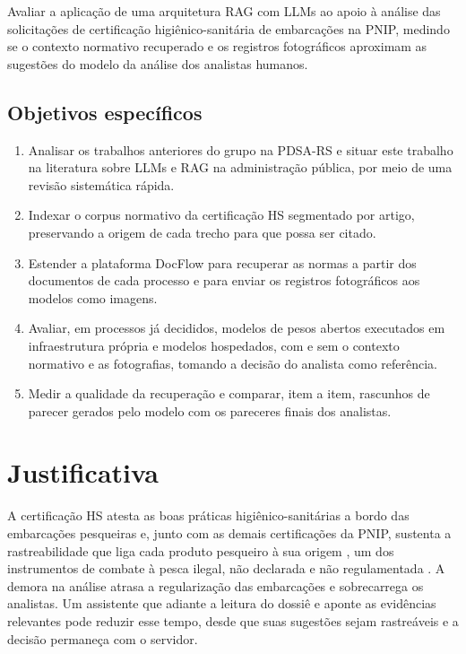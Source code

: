 Avaliar a aplicação de uma arquitetura RAG com LLMs ao apoio à análise das solicitações de certificação higiênico-sanitária de embarcações na PNIP, medindo se o contexto normativo recuperado e os registros fotográficos aproximam as sugestões do modelo da análise dos analistas humanos.

\subsection{Objetivos específicos}

\begin{enumerate}
	\item Analisar os trabalhos anteriores do grupo na PDSA-RS e situar este trabalho na literatura sobre LLMs e RAG na administração pública, por meio de uma revisão sistemática rápida.
	\item Indexar o corpus normativo da certificação HS segmentado por artigo, preservando a origem de cada trecho para que possa ser citado.
	\item Estender a plataforma DocFlow para recuperar as normas a partir dos documentos de cada processo e para enviar os registros fotográficos aos modelos como imagens.
	\item Avaliar, em processos já decididos, modelos de pesos abertos executados em infraestrutura própria e modelos hospedados, com e sem o contexto normativo e as fotografias, tomando a decisão do analista como referência.
	\item Medir a qualidade da recuperação e comparar, item a item, rascunhos de parecer gerados pelo modelo com os pareceres finais dos analistas.
\end{enumerate}

\section{Justificativa}
\label{sec:justificativa}

A certificação HS atesta as boas práticas higiênico-sanitárias a bordo das embarcações pesqueiras e, junto com as demais certificações da PNIP, sustenta a rastreabilidade que liga cada produto pesqueiro à sua origem \cite{Olsen2018}, um dos instrumentos de combate à pesca ilegal, não declarada e não regulamentada \cite{Agnew2009}. A demora na análise atrasa a regularização das embarcações e sobrecarrega os analistas. Um assistente que adiante a leitura do dossiê e aponte as evidências relevantes pode reduzir esse tempo, desde que suas sugestões sejam rastreáveis e a decisão permaneça com o servidor.

